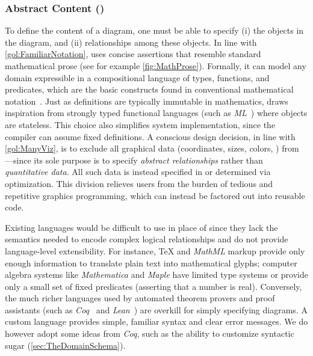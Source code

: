 \subsubsection{Abstract Content (\Substance{})}
\label{sec:MathematicalContent}

To define the content of a diagram, one must be able to specify (i) the objects in the diagram, and (ii) relationships among these objects.  In line with \ref{gol:FamiliarNotation}, \Substance{} uses concise assertions that resemble standard mathematical prose (see for example \cref{fig:MathProse}).  Formally, it can model any domain expressible in a compositional language of types, functions, and predicates, which are the basic constructs found in conventional mathematical notation~\cite{ganesalingam2013language}.  Just as definitions are typically immutable in mathematics, \Substance{} draws inspiration from strongly typed functional languages (such as \emph{ML}~\cite{Milner:1997:DSM}) where objects are stateless.  This choice also simplifies system implementation, since the compiler can assume fixed definitions.  %
A conscious design decision, in line with \ref{gol:ManyViz}, is to exclude all graphical data (coordinates, sizes, colors, \etc{}) from \Substance{}---since its sole purpose is to specify \emph{abstract relationships} rather than \emph{quantitative data}.  All such data is instead specified in \Style{} or determined via optimization.  This division relieves users from the burden of tedious and repetitive graphics programming, which can instead be factored out into reusable \Style{} code.

Existing languages would be difficult to use in place of \Substance{} since they lack the semantics needed to encode complex logical relationships and do not provide language-level extensibility.  For instance, \TeX{} \cite{Beeton:2016:CMT} and \emph{MathML} \cite{Miner:2005:IMM} markup provide only enough information to translate plain text into mathematical glyphs; computer algebra systems like \emph{Mathematica} and \emph{Maple} have limited type systems or provide only a small set of fixed predicates (\eg asserting that a number is real).  Conversely, the much richer languages used by automated theorem provers and proof assistants (such as \emph{Coq}~\cite{Bertot:2013:ITP} and \emph{Lean}~\cite{deMoura:2015:LTP}) are overkill for simply specifying diagrams. A custom language provides simple, familiar syntax and clear error messages.  We do however adopt some ideas from \emph{Coq}, such as the ability to customize syntactic sugar (\cref{sec:TheDomainSchema}).

